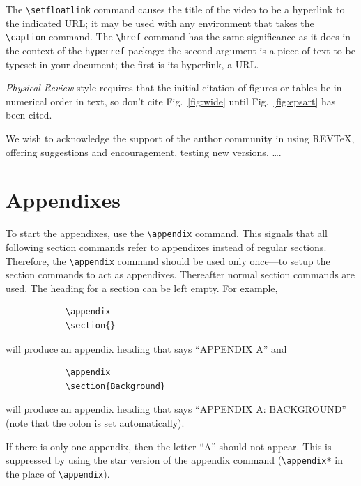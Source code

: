 \documentclass[%
reprint,
amsmath,amssymb,
aps,
]{revtex4-2}
\begin{document}
		The \verb+\setfloatlink+ command causes the title of the video to be a hyperlink to the
		indicated URL; it may be used with any environment that takes the \verb+\caption+
		command.
		The \verb+\href+ command has the same significance as it does in the context of
		the \texttt{hyperref} package: the second argument is a piece of text to be 
		typeset in your document; the first is its hyperlink, a URL.
		
		\textit{Physical Review} style requires that the initial citation of
		figures or tables be in numerical order in text, so don't cite
		Fig.~\ref{fig:wide} until Fig.~\ref{fig:epsart} has been cited.
		
		\begin{acknowledgments}
			We wish to acknowledge the support of the author community in using
			REV\TeX{}, offering suggestions and encouragement, testing new versions,
			\dots.
		\end{acknowledgments}
		
		\appendix
		
		\section{Appendixes}
		
		To start the appendixes, use the \verb+\appendix+ command.
		This signals that all following section commands refer to appendixes
		instead of regular sections. Therefore, the \verb+\appendix+ command
		should be used only once---to setup the section commands to act as
		appendixes. Thereafter normal section commands are used. The heading
		for a section can be left empty. For example,
		\begin{verbatim}
			\appendix
			\section{}
		\end{verbatim}
		will produce an appendix heading that says ``APPENDIX A'' and
		\begin{verbatim}
			\appendix
			\section{Background}
		\end{verbatim}
		will produce an appendix heading that says ``APPENDIX A: BACKGROUND''
		(note that the colon is set automatically).
		
		If there is only one appendix, then the letter ``A'' should not
		appear. This is suppressed by using the star version of the appendix
		command (\verb+\appendix*+ in the place of \verb+\appendix+).
		
\end{document}
